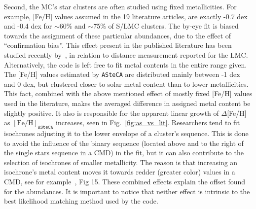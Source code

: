 \documentclass[draft]{aa}
\begin{document}
\noindent Second, the MC's star clusters are often studied
using fixed metallicities. For example, [Fe/H] values assumed in the 19
literature articles, are exactly -0.7 dex and -0.4 dex for $\sim$60\% and
$\sim$75\% of S/LMC clusters. The by-eye fit is biased towards the
assignment of these particular abundances, due to the effect
of ``confirmation bias''. This effect present in the published
literature has been studied recently by~\cite{de_Grijs_2014}, in relation to
distance measurement reported for the LMC.\@
Alternatively, the code is left free to fit metal contents in the
entire range given. The [Fe/H] values estimated by \texttt{ASteCA} are
distributed mainly between -1 dex and 0 dex, but clustered closer to solar
metal content than to lower metallicities. This fact, combined with the above
mentioned effect of mostly fixed [Fe/H] values used in the literature, makes the
averaged difference in assigned metal content be slightly positive.
It also is responsible for the apparent linear growth of $\Delta$[Fe/H] as
$\mathrm{[Fe/H]}_{\mathtt{ASteCA}}$ increases, seen in Fig.~\ref{fig:as_vs_lit}.
%
Researchers tend to fit isochrones adjusting it to the lower envelope of a
cluster's sequence. This is done to avoid the influence of the binary
sequence (located above and to the right of the single stars sequence in a CMD)
in the fit, but it can also contribute to the selection of
isochrones of smaller metallicity. The reason is that increasing an
isochrone's metal content moves it towards redder (greater color) values in a
CMD, see for example~\cite{Bressan_2012}, Fig 15.
%
These combined effects explain the offset found for the abundances. It is
important to notice that neither effect is intrinsic to the best likelihood
matching method used by the code.
\end{document}
